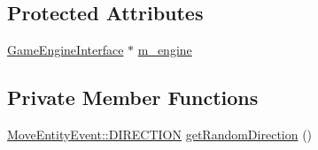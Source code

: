 \subsection*{Protected Attributes}
\begin{DoxyCompactItemize}
\item 
\hyperlink{classGameEngineInterface}{Game\-Engine\-Interface} $\ast$ \hyperlink{classGameSystemBase_aa9044eb22399f0c0ddd8f049738c62e5}{m\-\_\-engine}
\end{DoxyCompactItemize}
\subsection*{Private Member Functions}
\begin{DoxyCompactItemize}
\item 
\hyperlink{classMoveEntityEvent_a7058a943643bee9164a21e62e3392807}{Move\-Entity\-Event\-::\-D\-I\-R\-E\-C\-T\-I\-O\-N} \hyperlink{classNpcSystem_a3ece27c9f3e3d3084c879ba506e691d5}{get\-Random\-Direction} ()
\end{DoxyCompactItemize}


